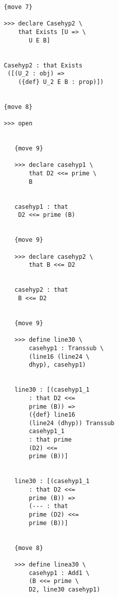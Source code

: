 \documentclass[12pt]{article}
\begin{document}
\begin{verbatim}
                        {move 7}

                        >>> declare Casehyp2 \
                            that Exists [U => \
                               U E B]


                        Casehyp2 : that Exists 
                         ([(U_2 : obj) => 
                            ({def} U_2 E B : prop)])


                        {move 8}

                        >>> open


                           {move 9}

                           >>> declare casehyp1 \
                               that D2 <<= prime \
                               B


                           casehyp1 : that 
                            D2 <<= prime (B)


                           {move 9}

                           >>> declare casehyp2 \
                               that B <<= D2


                           casehyp2 : that 
                            B <<= D2


                           {move 9}

                           >>> define line30 \
                               casehyp1 : Transsub \
                               (line16 (line24 \
                               dhyp), casehyp1)


                           line30 : [(casehyp1_1 
                               : that D2 <<= 
                               prime (B)) => 
                               ({def} line16 
                               (line24 (dhyp)) Transsub 
                               casehyp1_1 
                               : that prime 
                               (D2) <<= 
                               prime (B))]


                           line30 : [(casehyp1_1 
                               : that D2 <<= 
                               prime (B)) => 
                               (--- : that 
                               prime (D2) <<= 
                               prime (B))]


                           {move 8}

                           >>> define linea30 \
                               casehyp1 : Add1 \
                               (B <<= prime \
                               D2, line30 casehyp1)



\end{verbatim}
\end{document}
